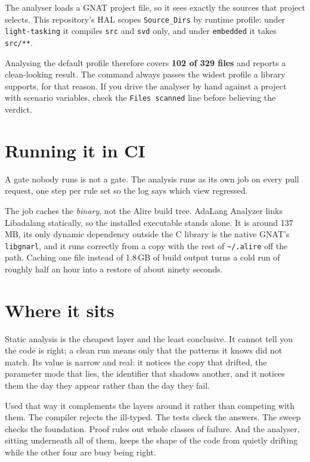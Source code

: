 The analyser loads a GNAT project file, so it sees exactly the sources that project
selects. This repository's HAL scopes \lstinline{Source_Dirs} by runtime profile: under
\texttt{light-tasking} it compiles \texttt{src} and \texttt{svd} only, and under
\texttt{embedded} it takes \texttt{src/**}.

Analysing the default profile therefore covers \textbf{102 of 329 files} and reports a
clean-looking result. The command always passes the widest profile a library supports,
for that reason. If you drive the analyser by hand against a project with scenario
variables, check the \texttt{Files scanned} line before believing the verdict.

\section{Running it in CI}

A gate nobody runs is not a gate. The analysis runs as its own job on every pull
request, one step per rule set so the log says which view regressed.

The job caches the \emph{binary}, not the Alire build tree. AdaLang Analyzer links
Libadalang statically, so the installed executable stands alone. It is around
137\,MB, its only dynamic dependency outside the C library is the native GNAT's
\texttt{libgnarl}, and it runs correctly from a copy with the rest of
\texttt{\textasciitilde/.alire} off the path.
Caching one file instead of 1.8\,GB of build output turns a cold run of roughly half an
hour into a restore of about ninety seconds.

\section{Where it sits}

Static analysis is the cheapest layer and the least conclusive. It cannot tell you the
code is right; a clean run means only that the patterns it knows did not match. Its
value is narrow and real: it notices the copy that drifted, the parameter mode that
lies, the identifier that shadows another, and it notices them the day they appear
rather than the day they fail.

Used that way it complements the layers around it rather than competing with them. The
compiler rejects the ill-typed. The tests check the answers. The sweep checks the
foundation. Proof rules out whole classes of failure. And the analyser, sitting
underneath all of them, keeps the shape of the code from quietly drifting while the
other four are busy being right.
